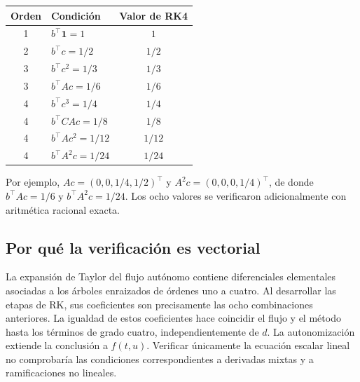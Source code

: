 \documentclass[11pt,a4paper]{article}
\theoremstyle{definition}\newtheorem{definition}[theorem]{Definición}
\theoremstyle{remark}\newtheorem{remark}[theorem]{Observación}
\begin{document}
\begin{center}
\begin{tabular}{@{}clc@{}}\toprule
Orden & Condición & Valor de RK4\\\midrule
1 & $b^\top\mathbf1=1$ & $1$\\
2 & $b^\top c=1/2$ & $1/2$\\
3 & $b^\top c^2=1/3$ & $1/3$\\
3 & $b^\top Ac=1/6$ & $1/6$\\
4 & $b^\top c^3=1/4$ & $1/4$\\
4 & $b^\top CAc=1/8$ & $1/8$\\
4 & $b^\top Ac^2=1/12$ & $1/12$\\
4 & $b^\top A^2c=1/24$ & $1/24$\\\bottomrule
\end{tabular}
\end{center}
Por ejemplo, $Ac=(0,0,1/4,1/2)^\top$ y
$A^2c=(0,0,0,1/4)^\top$, de donde
$b^\top Ac=1/6$ y $b^\top A^2c=1/24$.
Los ocho valores se verificaron adicionalmente con aritmética racional exacta.

\subsection{Por qué la verificación es vectorial}
La expansión de Taylor del flujo autónomo contiene diferenciales elementales
asociadas a los árboles enraizados de órdenes uno a cuatro. Al desarrollar
las etapas de RK, sus coeficientes son precisamente las ocho combinaciones
anteriores. La igualdad de estos coeficientes hace coincidir el flujo y el
método hasta los términos de grado cuatro, independientemente de $d$.
La autonomización extiende la conclusión a $f(t,u)$. Verificar únicamente
la ecuación escalar lineal no comprobaría las condiciones correspondientes
a derivadas mixtas y a ramificaciones no lineales.

\clearpage
\end{document}
